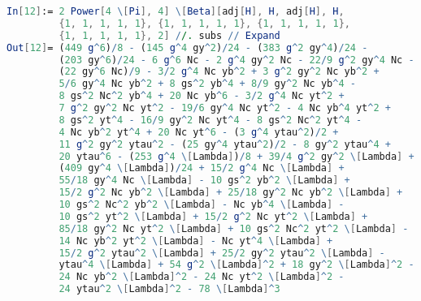 \documentclass{scrartcl}
\begin{document}
\begin{lstlisting}[language=mathematica,mathescape,columns=flexible,backgroundcolor=\color{light-gray}]
In[12]:= 2 Power[4 \[Pi], 4] \[Beta][adj[H], H, adj[H], H, 
         {1, 1, 1, 1, 1}, {1, 1, 1, 1, 1}, {1, 1, 1, 1, 1}, 
         {1, 1, 1, 1, 1}, 2] //. subs // Expand         
Out[12]= (449 g^6)/8 - (145 g^4 gy^2)/24 - (383 g^2 gy^4)/24 - 
         (203 gy^6)/24 - 6 g^6 Nc - 2 g^4 gy^2 Nc - 22/9 g^2 gy^4 Nc - 
         (22 gy^6 Nc)/9 - 3/2 g^4 Nc yb^2 + 3 g^2 gy^2 Nc yb^2 + 
         5/6 gy^4 Nc yb^2 + 8 gs^2 yb^4 + 8/9 gy^2 Nc yb^4 - 
         8 gs^2 Nc^2 yb^4 + 20 Nc yb^6 - 3/2 g^4 Nc yt^2 + 
         7 g^2 gy^2 Nc yt^2 - 19/6 gy^4 Nc yt^2 - 4 Nc yb^4 yt^2 + 
         8 gs^2 yt^4 - 16/9 gy^2 Nc yt^4 - 8 gs^2 Nc^2 yt^4 - 
         4 Nc yb^2 yt^4 + 20 Nc yt^6 - (3 g^4 ytau^2)/2 + 
         11 g^2 gy^2 ytau^2 - (25 gy^4 ytau^2)/2 - 8 gy^2 ytau^4 + 
         20 ytau^6 - (253 g^4 \[Lambda])/8 + 39/4 g^2 gy^2 \[Lambda] + 
         (409 gy^4 \[Lambda])/24 + 15/2 g^4 Nc \[Lambda] + 
         55/18 gy^4 Nc \[Lambda] - 10 gs^2 yb^2 \[Lambda] + 
         15/2 g^2 Nc yb^2 \[Lambda] + 25/18 gy^2 Nc yb^2 \[Lambda] + 
         10 gs^2 Nc^2 yb^2 \[Lambda] - Nc yb^4 \[Lambda] - 
         10 gs^2 yt^2 \[Lambda] + 15/2 g^2 Nc yt^2 \[Lambda] + 
         85/18 gy^2 Nc yt^2 \[Lambda] + 10 gs^2 Nc^2 yt^2 \[Lambda] - 
         14 Nc yb^2 yt^2 \[Lambda] - Nc yt^4 \[Lambda] + 
         15/2 g^2 ytau^2 \[Lambda] + 25/2 gy^2 ytau^2 \[Lambda] - 
         ytau^4 \[Lambda] + 54 g^2 \[Lambda]^2 + 18 gy^2 \[Lambda]^2 - 
         24 Nc yb^2 \[Lambda]^2 - 24 Nc yt^2 \[Lambda]^2 - 
         24 ytau^2 \[Lambda]^2 - 78 \[Lambda]^3
         
\end{lstlisting}
\newpage


\end{document}

